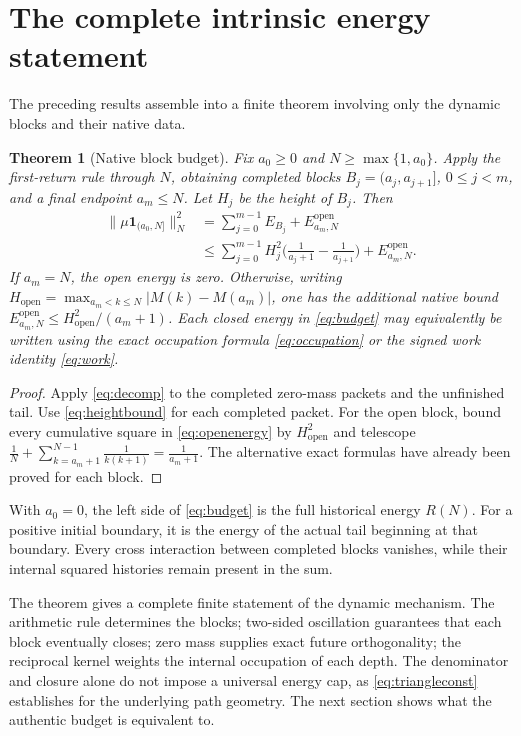 \documentclass[11pt]{article}
\newtheorem{theorem}{Theorem}[section]
\theoremstyle{definition}
\theoremstyle{remark}
\begin{document}
\section{The complete intrinsic energy statement}\label{sec:budget}

The preceding results assemble into a finite theorem involving only the dynamic blocks and their native data.

\begin{theorem}[Native block budget]\label{thm:budget}
Fix $a_0\ge0$ and $N\ge\max\{1,a_0\}$. Apply the first-return rule through $N$, obtaining completed blocks $B_j=(a_j,a_{j+1}]$, $0\le j<m$, and a final endpoint $a_m\le N$. Let $H_j$ be the height of $B_j$. Then
\begin{align}
\|\mu\mathbf 1_{(a_0,N]}\|_N^2&=\sum_{j=0}^{m-1}E_{B_j}+E^{\mathrm{open}}_{a_m,N}\label{eq:budget}\\
&\le\sum_{j=0}^{m-1}H_j^2\Big(\frac1{a_j+1}-\frac1{a_{j+1}}\Big)+E^{\mathrm{open}}_{a_m,N}.\label{eq:budget2}
\end{align}
If $a_m=N$, the open energy is zero. Otherwise, writing $H_{\mathrm{open}}=\max_{a_m<k\le N}|M(k)-M(a_m)|$, one has the additional native bound $E^{\mathrm{open}}_{a_m,N}\le H_{\mathrm{open}}^2/(a_m+1)$. Each closed energy in \eqref{eq:budget} may equivalently be written using the exact occupation formula \eqref{eq:occupation} or the signed work identity \eqref{eq:work}.
\end{theorem}

\begin{proof}
Apply \eqref{eq:decomp} to the completed zero-mass packets and the unfinished tail. Use \eqref{eq:heightbound} for each completed packet. For the open block, bound every cumulative square in \eqref{eq:openenergy} by $H_{\mathrm{open}}^2$ and telescope $\frac1N+\sum_{k=a_m+1}^{N-1}\frac1{k(k+1)}=\frac1{a_m+1}$. The alternative exact formulas have already been proved for each block.
\end{proof}

With $a_0=0$, the left side of \eqref{eq:budget} is the full historical energy $R(N)$. For a positive initial boundary, it is the energy of the actual tail beginning at that boundary. Every cross interaction between completed blocks vanishes, while their internal squared histories remain present in the sum.

The theorem gives a complete finite statement of the dynamic mechanism. The arithmetic rule determines the blocks; two-sided oscillation guarantees that each block eventually closes; zero mass supplies exact future orthogonality; the reciprocal kernel weights the internal occupation of each depth. The denominator and closure alone do not impose a universal energy cap, as \eqref{eq:triangleconst} establishes for the underlying path geometry. The next section shows what the authentic budget is equivalent to.
\end{document}
